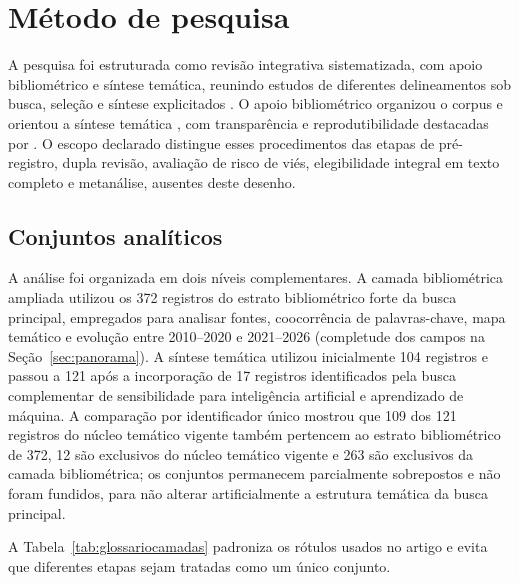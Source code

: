 \section{Método de pesquisa}
\label{sec:metodo}

A pesquisa foi estruturada como revisão integrativa sistematizada, com apoio bibliométrico e síntese temática, reunindo estudos de diferentes delineamentos sob busca, seleção e síntese explicitados \parencite{whittemore_revisaointegrativa_2005,snyder_revisaometodologia_2019}. O apoio bibliométrico organizou o corpus e orientou a síntese temática \parencite{donthu_bibliometria_2021}, com transparência e reprodutibilidade destacadas por \textcite{hu_revisao_sintese_2026}. O escopo declarado distingue esses procedimentos das etapas de pré-registro, dupla revisão, avaliação de risco de viés, elegibilidade integral em texto completo e metanálise, ausentes deste desenho.

\subsection{Conjuntos analíticos}

A análise foi organizada em dois níveis complementares. A camada bibliométrica ampliada utilizou os 372 registros do estrato bibliométrico forte da busca principal, empregados para analisar fontes, coocorrência de palavras-chave, mapa temático e evolução entre 2010--2020 e 2021--2026 (completude dos campos na Seção~\ref{sec:panorama}). A síntese temática utilizou inicialmente 104 registros e passou a 121 após a incorporação de 17 registros identificados pela busca complementar de sensibilidade para inteligência artificial e aprendizado de máquina. A comparação por identificador único mostrou que 109 dos 121 registros do núcleo temático vigente também pertencem ao estrato bibliométrico de 372, 12 são exclusivos do núcleo temático vigente e 263 são exclusivos da camada bibliométrica; os conjuntos permanecem parcialmente sobrepostos e não foram fundidos, para não alterar artificialmente a estrutura temática da busca principal.

A Tabela~\ref{tab:glossariocamadas} padroniza os rótulos usados no artigo e evita que diferentes etapas sejam tratadas como um único conjunto.

